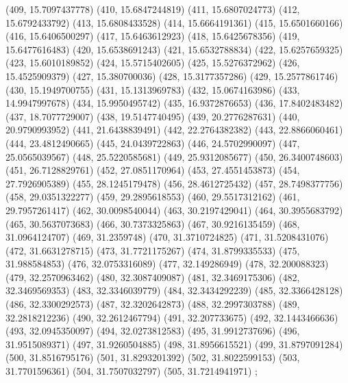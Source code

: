 {					(409, 15.7097437778)
					(410, 15.6847244819)
					(411, 15.6807024773)
					(412, 15.6792433792)
					(413, 15.6808433528)
					(414, 15.6664191361)
					(415, 15.6501660166)
					(416, 15.6406500297)
					(417, 15.6463612923)
					(418, 15.6425678356)
					(419, 15.6477616483)
					(420, 15.6538691243)
					(421, 15.6532788834)
					(422, 15.6257659325)
					(423, 15.6010189852)
					(424, 15.5715402605)
					(425, 15.5276372962)
					(426, 15.4525909379)
					(427, 15.380700036)
					(428, 15.3177357286)
					(429, 15.2577861746)
					(430, 15.1949700755)
					(431, 15.1313969783)
					(432, 15.0674163986)
					(433, 14.9947997678)
					(434, 15.9950495742)
					(435, 16.9372876653)
					(436, 17.8402483482)
					(437, 18.7077729007)
					(438, 19.5147740495)
					(439, 20.2776287631)
					(440, 20.9790993952)
					(441, 21.6438839491)
					(442, 22.2764382382)
					(443, 22.8866060461)
					(444, 23.4812490665)
					(445, 24.0439722863)
					(446, 24.5702990097)
					(447, 25.0565039567)
					(448, 25.5220585681)
					(449, 25.9312085677)
					(450, 26.3400748603)
					(451, 26.7128829761)
					(452, 27.0851170964)
					(453, 27.4551453873)
					(454, 27.7926905389)
					(455, 28.1245179478)
					(456, 28.4612725432)
					(457, 28.7498377756)
					(458, 29.0351322277)
					(459, 29.2895618553)
					(460, 29.5517312162)
					(461, 29.7957261417)
					(462, 30.0098540044)
					(463, 30.2197429041)
					(464, 30.3955683792)
					(465, 30.5637073683)
					(466, 30.7373325863)
					(467, 30.9216135459)
					(468, 31.0964124707)
					(469, 31.2359748)
					(470, 31.3710724825)
					(471, 31.5208431076)
					(472, 31.6631278715)
					(473, 31.7721175267)
					(474, 31.8799335533)
					(475, 31.988584853)
					(476, 32.0753316089)
					(477, 32.149286949)
					(478, 32.200088323)
					(479, 32.2570963462)
					(480, 32.3087409087)
					(481, 32.3469175306)
					(482, 32.3469569353)
					(483, 32.3346039779)
					(484, 32.3434292239)
					(485, 32.3366428128)
					(486, 32.3300292573)
					(487, 32.3202642873)
					(488, 32.2997303788)
					(489, 32.2818212236)
					(490, 32.2612467794)
					(491, 32.207733675)
					(492, 32.1443466636)
					(493, 32.0945350097)
					(494, 32.0273812583)
					(495, 31.9912737696)
					(496, 31.9515089371)
					(497, 31.9260504885)
					(498, 31.8956615521)
					(499, 31.8797091284)
					(500, 31.8516795176)
					(501, 31.8293201392)
					(502, 31.8022599153)
					(503, 31.7701596361)
					(504, 31.7507032797)
					(505, 31.7214941971)
				};
